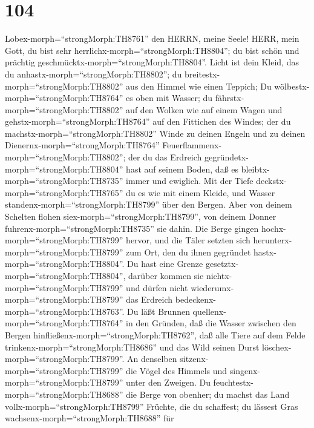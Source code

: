 \hypertarget{section-103}{%
\section{104}\label{section-103}}

 Lobex-morph=``strongMorph:TH8761'' den HERRN, meine Seele!
HERR, mein Gott, du bist sehr herrlichx-morph=``strongMorph:TH8804''; du
bist schön und prächtig geschmücktx-morph=``strongMorph:TH8804''.
 Licht ist dein Kleid, das du
anhastx-morph=``strongMorph:TH8802''; du
breitestx-morph=``strongMorph:TH8802'' aus den Himmel wie einen Teppich;
 Du wölbestx-morph=``strongMorph:TH8764'' es oben mit
Wasser; du fährstx-morph=``strongMorph:TH8802'' auf den Wolken wie auf
einem Wagen und gehstx-morph=``strongMorph:TH8764'' auf den Fittichen
des Windes;  der du machstx-morph=``strongMorph:TH8802''
Winde zu deinen Engeln und zu deinen
Dienernx-morph=``strongMorph:TH8764''
Feuerflammenx-morph=``strongMorph:TH8802'';  der du das
Erdreich gegründetx-morph=``strongMorph:TH8804'' hast auf seinem Boden,
daß es bleibtx-morph=``strongMorph:TH8735'' immer und ewiglich.
 Mit der Tiefe deckstx-morph=``strongMorph:TH8765'' du es
wie mit einem Kleide, und Wasser standenx-morph=``strongMorph:TH8799''
über den Bergen.  Aber von deinem Schelten flohen
siex-morph=``strongMorph:TH8799'', von deinem Donner
fuhrenx-morph=``strongMorph:TH8735'' sie dahin.  Die Berge
gingen hochx-morph=``strongMorph:TH8799'' hervor, und die Täler setzten
sich herunterx-morph=``strongMorph:TH8799'' zum Ort, den du ihnen
gegründet hastx-morph=``strongMorph:TH8804''.  Du hast eine
Grenze gesetztx-morph=``strongMorph:TH8804'', darüber kommen sie
nichtx-morph=``strongMorph:TH8799'' und dürfen nicht
wiederumx-morph=``strongMorph:TH8799'' das Erdreich
bedeckenx-morph=``strongMorph:TH8763''.  Du läßt Brunnen
quellenx-morph=``strongMorph:TH8764'' in den Gründen, daß die Wasser
zwischen den Bergen hinfließenx-morph=``strongMorph:TH8762'',
 daß alle Tiere auf dem Felde
trinkenx-morph=``strongMorph:TH8686'' und das Wild seinen Durst
löschex-morph=``strongMorph:TH8799''.  An denselben
sitzenx-morph=``strongMorph:TH8799'' die Vögel des Himmels und
singenx-morph=``strongMorph:TH8799'' unter den Zweigen.  Du
feuchtestx-morph=``strongMorph:TH8688'' die Berge von obenher; du machst
das Land vollx-morph=``strongMorph:TH8799'' Früchte, die du schaffest;
 du lässest Gras wachsenx-morph=``strongMorph:TH8688'' für
